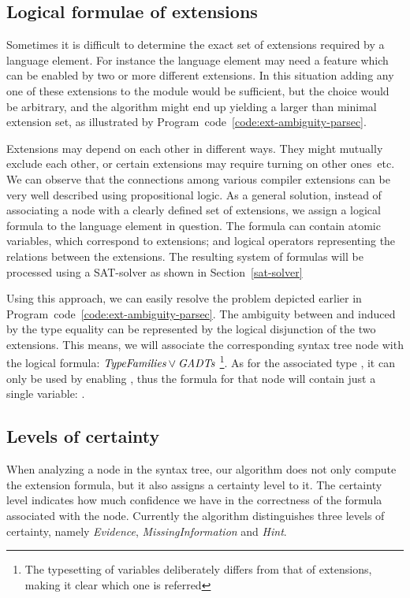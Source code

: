 \documentclass[main.tex]{subfiles}
\begin{document}
	\subsection{Logical formulae of extensions}
	
	Sometimes it is difficult to determine the exact set of extensions required by a language element. For instance the language element may need a feature which can be enabled by two or more different extensions. In this situation adding any one of these extensions to the module would be sufficient, but the choice would be arbitrary, and the algorithm might end up yielding a larger than minimal extension set, as illustrated by Program~code~\ref{code:ext-ambiguity-parsec}.
	
	Extensions may depend on each other in different ways. They might mutually exclude each other, or certain extensions may require turning on other ones~etc.	We can observe that the connections among various compiler extensions can be very well described using propositional logic. As a general solution, instead of associating a node with a clearly defined set of extensions, we assign a logical formula to the language element in question. The formula can contain atomic variables, which correspond to extensions; and logical operators representing the relations between the extensions. The resulting system of formulas will be processed using a SAT-solver as shown in Section~\ref{sat-solver}
	
	Using this approach, we can easily resolve the problem depicted earlier in Program~code~\ref{code:ext-ambiguity-parsec}. The ambiguity between  and  induced by the type equality can be represented by the logical disjunction of the two extensions. This means, we will associate the corresponding syntax tree node with the logical formula: $\textit{TypeFamilies} \lor \textit{GADTs}$ \footnote{The typesetting of variables deliberately differs from that of extensions, making it clear which one is referred}. As for the associated type , it can only be used by enabling , thus the formula for that node will contain just a single variable: .
	
	\subsection{Levels of certainty} \label{certainty-levels}
	
	When analyzing a node in the syntax tree, our algorithm does not only compute the extension formula, but it also assigns a certainty level to it. The certainty level indicates how much confidence we have in the correctness of the formula associated with the node. Currently the algorithm distinguishes three levels of certainty, namely \emph{Evidence}, \emph{MissingInformation} and \emph{Hint}. 
	
\end{document}
